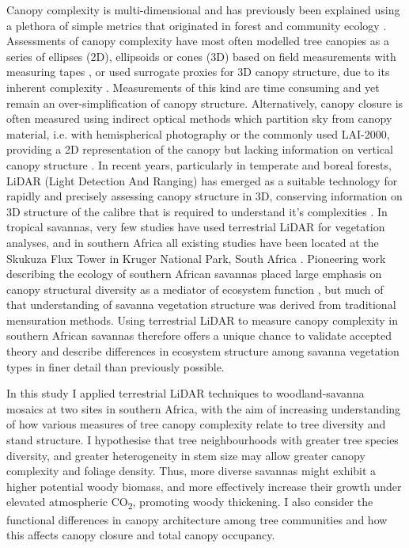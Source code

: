 \documentclass[11pt,a4paper]{article}
\begin{document}
Canopy complexity is multi-dimensional and has previously been explained using a plethora of simple metrics that originated in forest and community ecology \citep{Kershaw2017}. Assessments of canopy complexity have most often modelled tree canopies as a series of ellipses (2D), ellipsoids or cones (3D) based on field measurements with measuring tapes \citep{Jucker2015}, or used surrogate proxies for 3D canopy structure, due to its inherent complexity \citep{Seidel2011}. Measurements of this kind are time consuming and yet remain an over-simplification of canopy structure. Alternatively, canopy closure is often measured using indirect optical methods which partition sky from canopy material, i.e. with hemispherical photography or the commonly used LAI-2000, providing a 2D representation of the canopy but lacking information on vertical canopy structure \citep{Jonckheere2004}. In recent years, particularly in temperate and boreal forests, LiDAR (Light Detection And Ranging) has emerged as a suitable technology for rapidly and precisely assessing canopy structure in 3D, conserving information on 3D structure of the calibre that is required to understand it's complexities \citep{Muir2018, Calders2020}. In tropical savannas, very few studies have used terrestrial LiDAR for vegetation analyses, and in southern Africa all existing studies have been located at the Skukuza Flux Tower in Kruger National Park, South Africa \citep{Muumbe2021}. Pioneering work describing the ecology of southern African savannas placed large emphasis on canopy structural diversity as a mediator of ecosystem function \citep{Solbrig1996}, but much of that understanding of savanna vegetation structure was derived from traditional mensuration methods. Using terrestrial LiDAR to measure canopy complexity in southern African savannas therefore offers a unique chance to validate accepted theory and describe differences in ecosystem structure among savanna vegetation types in finer detail than previously possible.

In this study I applied terrestrial LiDAR techniques to woodland-savanna mosaics at two sites in southern Africa, with the aim of increasing understanding of how various measures of tree canopy complexity relate to tree diversity and stand structure. I hypothesise that tree neighbourhoods with greater tree species diversity, and greater heterogeneity in stem size may allow greater canopy complexity and foliage density. Thus, more diverse savannas might exhibit a higher potential woody biomass, and more effectively increase their growth under elevated atmospheric CO\textsubscript{2}, promoting woody thickening. I also consider the functional differences in canopy architecture among tree communities and how this affects canopy closure and total canopy occupancy.
\end{document}
